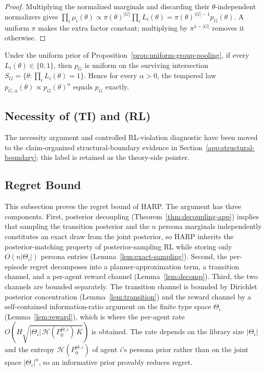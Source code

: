 \begin{proof}
Multiplying the normalized marginals and discarding their $\theta$-independent normalizers gives $\prod_i\mu_i(\theta)\propto\pi(\theta)^{|G|}\prod_iL_i(\theta)=\pi(\theta)^{|G|-1}p_G(\theta)$. A uniform $\pi$ makes the extra factor constant; multiplying by $\pi^{1-|G|}$ removes it otherwise.
\end{proof}

\begin{corollary}
\label{cor:indicator-temperature}
Under the uniform prior of Proposition~\ref{prop:uniform-group-pooling}, if every $L_i(\theta)\in\{0,1\}$, then $p_G$ is uniform on the surviving intersection $S_G=\{\theta:\prod_iL_i(\theta)=1\}$. Hence for every $\alpha>0$, the tempered law $p_{G,\alpha}(\theta)\propto p_G(\theta)^\alpha$ equals $p_G$ exactly.
\end{corollary}

\subsection{Necessity of (TI) and (RL)}
\label{app:necessity}
\label{sec:necessity}

The necessity argument and controlled RL-violation diagnostic have been moved to the claim-organized structural-boundary evidence in Section~\ref{app:structural-boundary}; this label is retained as the theory-side pointer.

\subsection{Regret Bound}
\label{app:regret-bound}
\label{sec:regret-bound-app}

This subsection proves the regret bound of HARP. The argument has three components. First, posterior decoupling (Theorem~\ref{thm:decoupling-app}) implies that sampling the transition posterior and the $n$ persona marginals independently constitutes an exact draw from the joint posterior, so HARP inherits the posterior-matching property of posterior-sampling RL while storing only $O(n|\Theta_i|)$ persona entries (Lemma~\ref{lem:exact-sampling}). Second, the per-episode regret decomposes into a planner-approximation term, a transition channel, and a per-agent reward channel (Lemma~\ref{lem:decomp}). Third, the two channels are bounded separately. The transition channel is bounded by Dirichlet posterior concentration (Lemma~\ref{lem:transition}) and the reward channel by a self-contained information-ratio argument on the finite type space $\Theta_i$ (Lemma~\ref{lem:reward}), which is where the per-agent rate $O(H\sqrt{|\Theta_i|\,\mathcal H(P_0^{\Theta,i})\,K})$ is obtained. The rate depends on the library size $|\Theta_i|$ and the entropy $\mathcal H(P_0^{\Theta,i})$ of agent $i$'s persona prior rather than on the joint space $|\Theta_i|^n$, so an informative prior provably reduces regret.

